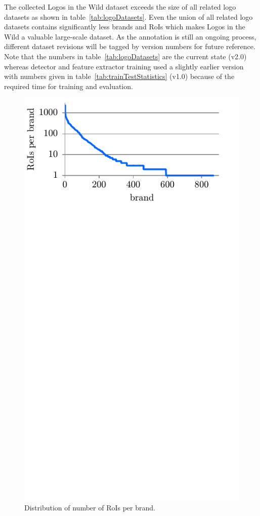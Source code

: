 \documentclass[a4paper,twoside]{article}
\begin{document}
The collected Logos in the Wild dataset exceeds the size of all related logo datasets as shown in table~\ref{tab:logoDatasets}. Even the union of all related logo datasets contains significantly less brands and RoIs which makes Logos in the Wild a valuable large-scale dataset.
As the annotation is still an ongoing process, different dataset revisions will be tagged by version numbers for future reference. Note that the numbers in table~\ref{tab:logoDatasets} are the current state (v2.0) whereas detector and feature extractor training used a slightly earlier version with numbers given in table~\ref{tab:trainTestStatistics} (v1.0) because of the required time for training and evaluation.
%
\begin{figure}%
\centering%
\includegraphics[width=\linewidth, trim=0cm 11cm 0cm 0cm, clip]{img/brandDistribution.pdf}%
\caption{Distribution of number of RoIs per brand.}%
\label{fig:brandDistribution}
\end{figure}%
\end{document}
